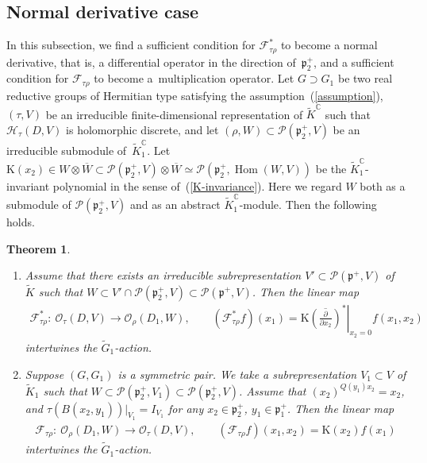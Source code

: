 \documentclass[pdftex]{sigma}
\numberwithin{equation}{section}
\newtheorem{Theorem}{Theorem}[section]
\newcommand{\BC}{\mathbb{C}}
\newcommand{\fp}{\mathfrak{p}}
\newcommand{\cF}{\mathcal{F}}
\newcommand{\cH}{\mathcal{H}}
\newcommand{\cO}{\mathcal{O}}
\newcommand{\cP}{\mathcal{P}}
\newcommand{\rK}{\mathrm{K}}
\newcommand{\Hom}{\operatorname{Hom}}
\begin{document}
\subsection{Normal derivative case}\label{sect_normal_derivative}
In this subsection, we find a sufficient condition for $\cF_{\tau\rho}^*$ to become a normal derivative,
that is, a differential operator in the direction of~$\fp^+_2$,
and a sufficient condition for $\cF_{\tau\rho}$ to become a~multiplication operator.
Let $G\supset G_1$ be two real reductive groups of Hermitian type satisfying the assumption~(\ref{assumption}),
$(\tau,V)$ be an irreducible finite-dimensional representation of $\tilde{K}^\BC$ such that~$\cH_\tau(D,V)$ is holomorphic discrete,
and let $(\rho,W)\subset\cP(\fp^+_2,V)$ be an irreducible submodule of~$\tilde{K}^\BC_1$.
Let $\rK(x_2)\in W\otimes\overline{W}\subset\cP(\fp^+_2,V)\otimes\overline{W}\simeq\cP(\fp^+_2,\Hom(W,V))$
be the $\tilde{K}_1^\BC$-invariant polynomial in the sense of~(\ref{K-invariance}).
Here we regard $W$ both as a submodule of $\cP(\fp^+_2,V)$ and as an abstract $\tilde{K}^\BC_1$-module. Then the following holds.
\begin{Theorem}\label{normal_derivative}\quad
\begin{enumerate}\itemsep=0pt
\item[$(1)$] Assume that there exists an irreducible subrepresentation $V'\subset\cP(\fp^+,V)$ of $\tilde{K}$ such that
$W\subset V'\cap \cP(\fp^+_2,V)\subset\cP(\fp^+,V)$. Then the linear map
\begin{gather*}
\cF_{\tau\rho}^*\colon \ \cO_\tau(D,V)\to\cO_\rho(D_1,W), \qquad
(\cF_{\tau\rho}^*f)(x_1)=\rK\left.\left(\overline{\frac{\partial}{\partial x_2}}\right)^*\right|_{x_2=0}f(x_1,x_2)
\end{gather*}
intertwines the $\tilde{G}_1$-action.
\item[$(2)$] Suppose $(G,G_1)$ is a symmetric pair. We take a subrepresentation $V_1\subset V$ of $\tilde{K}_1$ such that
$W\subset\cP(\fp^+_2,V_1)\subset\cP(\fp^+_2,V)$.
Assume that $(x_2)^{Q(y_1)x_2}=x_2$, and $\tau(B(x_2,y_1))|_{V_1}=I_{V_1}$ for any $x_2\in\fp^+_2$, $y_1\in\fp^+_1$.
Then the linear map
\begin{gather*}
\cF_{\tau\rho}\colon \ \cO_\rho(D_1,W)\to \cO_\tau(D,V), \qquad
(\cF_{\tau\rho}f)(x_1,x_2)=\rK(x_2)f(x_1)
\end{gather*}
intertwines the $\tilde{G}_1$-action.
\end{enumerate}
\end{Theorem}
\end{document}
